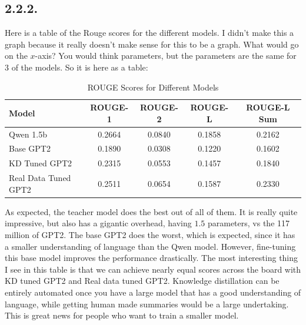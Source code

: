 \documentclass[12pt]{article}
\theoremstyle{definitionstyle}
\begin{document}
    \subsection*{2.2.2.}
    Here is a table of the Rouge scores for the different models. I didn't make this a graph because it really doesn't make sense for this to be a graph. What would go on the $x$-axis? You would think parameters, but the parameters are the same for 3 of the models. So it is here as a table:
    \begin{table}[h!]
        \centering
        \begin{tabular}{|l|c|c|c|c|}
        \hline
        \textbf{Model} & \textbf{ROUGE-1} & \textbf{ROUGE-2} & \textbf{ROUGE-L} & \textbf{ROUGE-L Sum} \\ \hline
        Qwen 1.5b & 0.2664 & 0.0840 & 0.1858 & 0.2162 \\ \hline
        Base GPT2 & 0.1890 & 0.0308 & 0.1220 & 0.1602 \\ \hline
        KD Tuned GPT2 & 0.2315 & 0.0553 & 0.1457 & 0.1840 \\ \hline
        Real Data Tuned GPT2 & 0.2511 & 0.0654 & 0.1587 & 0.2330 \\ \hline
        \end{tabular}
        \caption{ROUGE Scores for Different Models}
        \label{tab:rouge_scores}
    \end{table}
    As expected, the teacher model does the best out of all of them. It is really quite impressive, but also has a gigantic overhead, having $1.5$ parameters, vs the 117 million of GPT2. The base GPT2 does the worst, which is expected, since it has a smaller understanding of language than the Qwen model. However, fine-tuning this base model improves the performance drastically. The most interesting thing I see in this table is that we can achieve nearly equal scores across the board with KD tuned GPT2 and Real data tuned GPT2. Knowledge distillation can be entirely automated once you have a large model that has a good understanding of language, while getting human made summaries would be a large undertaking. This is great news for people who want to train a smaller model. 
\end{document}
